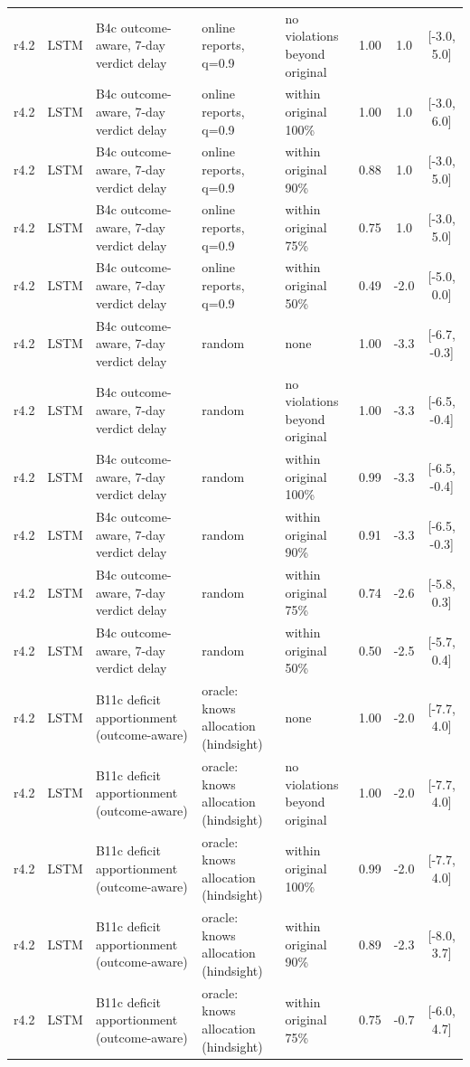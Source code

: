\begin{longtable}{lllp{4.2cm}p{3.4cm}ccc}
r4.2 & LSTM & B4c outcome-aware, 7-day verdict delay & online reports, q=0.9 & no violations beyond original & 1.00 & 1.0 & [-3.0, 5.0] \\
r4.2 & LSTM & B4c outcome-aware, 7-day verdict delay & online reports, q=0.9 & within original 100\% & 1.00 & 1.0 & [-3.0, 6.0] \\
r4.2 & LSTM & B4c outcome-aware, 7-day verdict delay & online reports, q=0.9 & within original 90\% & 0.88 & 1.0 & [-3.0, 5.0] \\
r4.2 & LSTM & B4c outcome-aware, 7-day verdict delay & online reports, q=0.9 & within original 75\% & 0.75 & 1.0 & [-3.0, 5.0] \\
r4.2 & LSTM & B4c outcome-aware, 7-day verdict delay & online reports, q=0.9 & within original 50\% & 0.49 & -2.0 & [-5.0, 0.0] \\
r4.2 & LSTM & B4c outcome-aware, 7-day verdict delay & random & none & 1.00 & -3.3 & [-6.7, -0.3] \\
r4.2 & LSTM & B4c outcome-aware, 7-day verdict delay & random & no violations beyond original & 1.00 & -3.3 & [-6.5, -0.4] \\
r4.2 & LSTM & B4c outcome-aware, 7-day verdict delay & random & within original 100\% & 0.99 & -3.3 & [-6.5, -0.4] \\
r4.2 & LSTM & B4c outcome-aware, 7-day verdict delay & random & within original 90\% & 0.91 & -3.3 & [-6.5, -0.3] \\
r4.2 & LSTM & B4c outcome-aware, 7-day verdict delay & random & within original 75\% & 0.74 & -2.6 & [-5.8, 0.3] \\
r4.2 & LSTM & B4c outcome-aware, 7-day verdict delay & random & within original 50\% & 0.50 & -2.5 & [-5.7, 0.4] \\
r4.2 & LSTM & B11c deficit apportionment (outcome-aware) & oracle: knows allocation (hindsight) & none & 1.00 & -2.0 & [-7.7, 4.0] \\
r4.2 & LSTM & B11c deficit apportionment (outcome-aware) & oracle: knows allocation (hindsight) & no violations beyond original & 1.00 & -2.0 & [-7.7, 4.0] \\
r4.2 & LSTM & B11c deficit apportionment (outcome-aware) & oracle: knows allocation (hindsight) & within original 100\% & 0.99 & -2.0 & [-7.7, 4.0] \\
r4.2 & LSTM & B11c deficit apportionment (outcome-aware) & oracle: knows allocation (hindsight) & within original 90\% & 0.89 & -2.3 & [-8.0, 3.7] \\
r4.2 & LSTM & B11c deficit apportionment (outcome-aware) & oracle: knows allocation (hindsight) & within original 75\% & 0.75 & -0.7 & [-6.0, 4.7] \\

\end{longtable}
